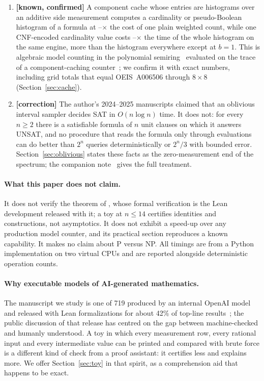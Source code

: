 \documentclass[11pt]{article}
\theoremstyle{definition}
\theoremstyle{remark}
\newcommand{\known}{\textbf{[known, confirmed]}}
\newcommand{\corr}{\textbf{[correction]}}
\begin{document}
\begin{enumerate}[leftmargin=1.6em,itemsep=2pt]
\item \known{} A component cache whose entries are histograms over an additive side measurement computes a cardinality or pseudo-Boolean histogram of a formula at \histOverPlainMin--\histOverPlainMax$\times$ the cost of one plain weighted count, while one CNF-encoded cardinality value costs \encRatioMin--\encRatioMax$\times$ the time of the whole histogram on the same engine, more than the histogram everywhere except at $b = 1$. This is algebraic model counting in the polynomial semiring~\citep{KVD17} evaluated on the trace of a component-caching counter~\citep{HD05,HD07}; we confirm it with exact numbers, including grid totals that equal OEIS~A006506 through $8 \times 8$ (Section~\ref{sec:cache}).
\item \corr{} The author's 2024--2025 manuscripts claimed that an oblivious interval sampler decides SAT in $O(n \log n)$ time. It does not: for every $n \ge 2$ there is a satisfiable formula of $n$ unit clauses on which it answers UNSAT, and no procedure that reads the formula only through evaluations can do better than $2^n$ queries deterministically or $2^n/3$ with bounded error. Section~\ref{sec:oblivious} states these facts as the zero-measurement end of the spectrum; the companion note~\citep{McE26note} gives the full treatment.
\end{enumerate}

\paragraph{What this paper does not claim.} It does not verify the theorem of \citet{OpenAI26}, whose formal verification is the Lean development released with it; a toy at $n \le 14$ certifies identities and constructions, not asymptotics. It does not exhibit a speed-up over any production model counter, and its practical section reproduces a known capability. It makes no claim about P versus NP. All timings are from a Python implementation on two virtual CPUs and are reported alongside deterministic operation counts.

\paragraph{Why executable models of AI-generated mathematics.} The manuscript we study is one of 719 produced by an internal OpenAI model and released with Lean formalizations for about 42\% of top-line results~\citep{OAIrepo}; the public discussion of that release has centred on the gap between machine-checked and humanly understood. A toy in which every measurement row, every rational input and every intermediate value can be printed and compared with brute force is a different kind of check from a proof assistant: it certifies less and explains more. We offer Section~\ref{sec:toy} in that spirit, as a comprehension aid that happens to be exact.
\end{document}
